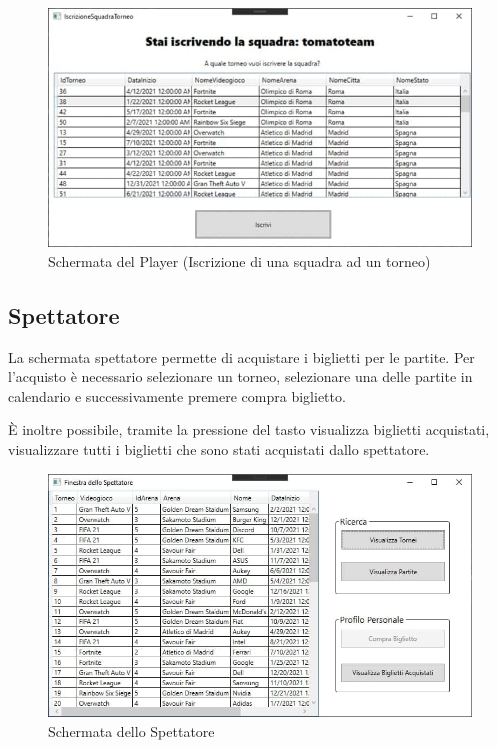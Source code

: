 \documentclass[a4paper,12pt]{report}
\begin{document}
\begin{figure}[!htb]
	\centerline{\includegraphics[scale=1.5]{img/player_iscrizione.jpg}}
	\caption{Schermata del Player (Iscrizione di una squadra ad un torneo)}
	\label{img:player_iscrizione}
\end{figure}

\subsection{Spettatore}
La schermata spettatore permette di acquistare i biglietti per le partite. Per l’acquisto è necessario selezionare un torneo, selezionare una delle partite in calendario e successivamente premere compra biglietto.

È inoltre possibile, tramite la pressione del tasto visualizza biglietti acquistati,  visualizzare tutti i biglietti che sono stati acquistati dallo spettatore.

\begin{figure}[!htb]
	\centerline{\includegraphics[scale=0.85]{img/spettatore_filled.jpg}}
	\caption{Schermata dello Spettatore}
	\label{img:spettatore_filled}
\end{figure}
\end{document}
